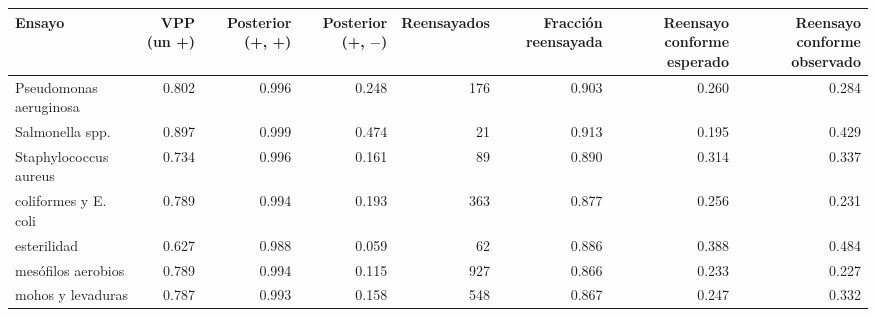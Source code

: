 \begin{tabular}{lrrrrrrr}
\toprule
Ensayo & VPP (un +) & Posterior (+, +) & Posterior (+, $-$) & Reensayados & Fracción reensayada & Reensayo conforme esperado & Reensayo conforme observado \\
\midrule
Pseudomonas aeruginosa & 0.802 & 0.996 & 0.248 & 176 & 0.903 & 0.260 & 0.284 \\
Salmonella spp. & 0.897 & 0.999 & 0.474 & 21 & 0.913 & 0.195 & 0.429 \\
Staphylococcus aureus & 0.734 & 0.996 & 0.161 & 89 & 0.890 & 0.314 & 0.337 \\
coliformes y E. coli & 0.789 & 0.994 & 0.193 & 363 & 0.877 & 0.256 & 0.231 \\
esterilidad & 0.627 & 0.988 & 0.059 & 62 & 0.886 & 0.388 & 0.484 \\
mesófilos aerobios & 0.789 & 0.994 & 0.115 & 927 & 0.866 & 0.233 & 0.227 \\
mohos y levaduras & 0.787 & 0.993 & 0.158 & 548 & 0.867 & 0.247 & 0.332 \\
\bottomrule
\end{tabular}

